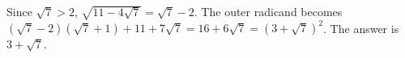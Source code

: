 Since $\sqrt7>2$, $\sqrt{11-4\sqrt7}=\sqrt7-2$. The outer radicand becomes $(\sqrt7-2)(\sqrt7+1)+11+7\sqrt7=16+6\sqrt7=(3+\sqrt7)^2$. The answer is $\boxed{3+\sqrt7}$.
